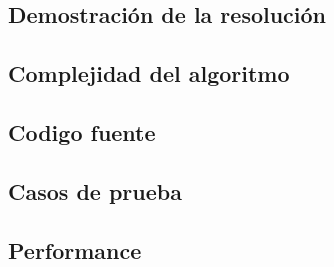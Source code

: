 \subsection{Demostraci\'on de la resoluci\'on}

\subsection{Complejidad del algoritmo}

\subsection{Codigo fuente}

\subsection{Casos de prueba}

\subsection{Performance}
